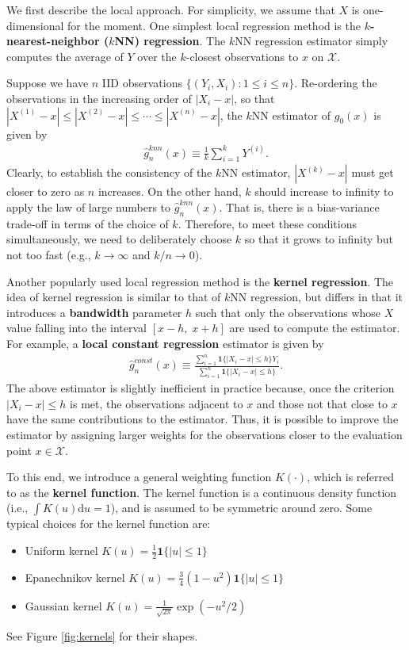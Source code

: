 \documentclass[10.5pt, A4paper, openany, uplatex]{book}
\newcommand{\mbf}{\mathbf}
\newcommand{\mcl}{\mathcal}
\renewcommand{\hat}{\widehat}
\numberwithin{equation}{section}
\begin{document}
We first describe the local approach.
For simplicity, we assume that $X$ is one-dimensional for the moment.
One simplest local regression method is the \textbf{$k$-nearest-neighbor ($k$NN) regression}.
The $k$NN regression estimator simply computes the average of $Y$ over the $k$-closest observations to $x$ on $\mcl{X}$.

Suppose we have $n$ IID observations $\{(Y_i, X_i): 1 \le i \le n\}$.
Re-ordering the observations in the increasing order of $|X_i - x|$, so that $|X^{(1)} - x| \le |X^{(2)} - x| \le \cdots \le |X^{(n)} - x|$, the $k$NN estimator of $g_0(x)$ is given by
\begin{align*}
	\hat g^{knn}_n(x) \equiv \frac{1}{k}\sum_{i = 1}^k Y^{(i)}.
\end{align*}
Clearly, to establish the consistency of the $k$NN estimator, $|X^{(k)} - x|$ must get closer to zero as $n$ increases.
On the other hand, $k$ should increase to infinity to apply the law of large numbers to $\hat g^{knn}_n(x)$. 
That is, there is a bias-variance trade-off in terms of the choice of $k$.
Therefore, to meet these conditions simultaneously, we need to deliberately choose $k$ so that it grows to infinity but not too fast (e.g., $k \to \infty$ and $k/n \to 0$).

\bigskip

Another popularly used local regression method is the \textbf{kernel regression}.
The idea of kernel regression is similar to that of $k$NN regression, but differs in that it introduces a \textbf{bandwidth} parameter $h$ such that only the observations whose $X$ value falling into the interval $[x-h, \; x+h]$ are used to compute the estimator.
For example, a \textbf{local constant regression} estimator is given by
\begin{align*}
	\hat g^{const}_n(x) \equiv \frac{\sum_{i = 1}^n \mbf{1}\{|X_i - x | \le h\} Y_i}{\sum_{i = 1}^n\mbf{1}\{|X_i - x | \le h\}}.
\end{align*}
The above estimator is slightly inefficient in practice because, once the criterion $|X_i - x | \le h$ is met, the observations adjacent to $x$ and those not that close to $x$ have the same contributions to the estimator.
Thus, it is possible to improve the estimator by assigning larger weights for the observations closer to the evaluation point $x \in \mcl{X}$.

To this end, we introduce a general weighting function $K(\cdot)$, which is referred to as the \textbf{kernel function}.
The kernel function is a continuous density function (i.e., $\int K(u)\text{d}u = 1$), and is assumed to be symmetric around zero.
Some typical choices for the kernel function are: 
\begin{itemize}
	\item Uniform kernel $K(u) = \frac{1}{2}\mbf{1}\{|u| \le 1\}$
	\item Epanechnikov kernel $K(u) = \frac{3}{4}(1-u^2)\mbf{1}\{|u| \le 1\}$
	\item Gaussian kernel $K(u) = \frac{1}{\sqrt{2\pi}}\exp(-u^2/2)$
\end{itemize}
See Figure \ref{fig:kernels} for their shapes.
\end{document}
